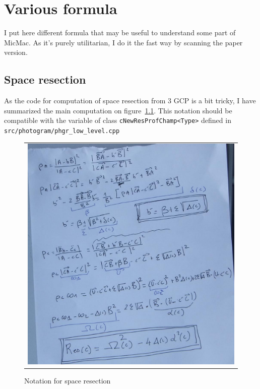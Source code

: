 \chapter{Various formula}

I put here different formula that may be useful to understand some part of MicMac. As it's purely utilitarian, I do it the fast way by
scanning the paper version.

\section{Space resection}


As the code for computation of space resection from $3$ GCP is a bit tricky, I have summarized the main
computation on figure~\ref{Not:ResSpace}. This notation should be compatible with the variable
of class {\tt cNewResProfChamp<Type>} defined in {\tt src/photogram/phgr\_low\_level.cpp}


\begin{figure}
\begin{tabular}{|c|}
   \hline \hline
   \includegraphics[width=160mm]{FIGS/Formules/NotattionSpace.JPG}
\end{tabular}
\label{Not:ResSpace}
\caption{Notation for space resection}
\end{figure}


